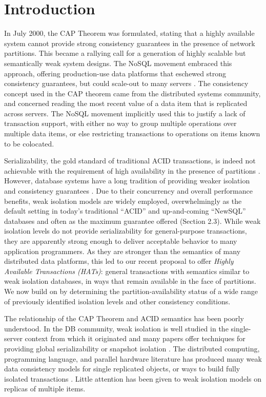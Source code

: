 
\section{Introduction}
In July 2000, the CAP Theorem \cite{40} was formulated, stating that a highly available system cannot provide strong consistency guarantees in the presence of network partitions. This became a rallying call for a generation of highly scalable but semantically weak system designs. The NoSQL movement embraced this approach, offering production-use data platforms that eschewed strong consistency guarantees, but could scale-out to many servers \cite{21, 25, 33}. The consistency concept used in the CAP theorem came from the distributed systems community, and concerned reading the most recent value of a data item that is replicated across servers. The NoSQL movement implicitly used this to justify a lack of  transaction support, with either no way to group multiple operations  over multiple data items, or else restricting transactions to operations on items known to be colocated. 

Serializability, the gold standard of traditional ACID transactions, is indeed not achievable with the requirement of high availability in the presence of partitions \cite{31}. However, database systems have a long tradition of providing weaker isolation and consistency guarantees \cite{4, 13, 43}. Due to their concurrency and overall performance benefits, weak isolation models are widely employed, overwhelmingly as the default setting in today’s traditional “ACID” and up-and-coming “NewSQL” databases and often as the maximum guarantee offered (Section 2.3). While weak isolation levels do not provide serializability for general-purpose transactions, they are apparently strong enough to deliver acceptable behavior to many application programmers. As they are stronger than the semantics of many distributed data platforms, this led to our recent proposal \cite{9} to offer \emph{Highly Available Transactions (HATs)}: general transactions with semantics similar to weak isolation databases, in ways that remain available in the face of partitions. We now build on \cite{9} by determining the partition-availability status of a wide range of previously identified isolation levels and other consistency conditions.

The relationship of the CAP Theorem and ACID semantics has been poorly understood. In the DB community, weak isolation is well studied in the single-server context from which it originated \cite{4, 13, 43} and many papers offer techniques for providing global serializability or snapshot isolation \cite{14,  30, 65; also cite several SI papers from PC members (Kemme, Elnikety, Salem, Daudgee)}. The distributed computing, programming language, and parallel hardware literature has produced many weak data consistency models for single replicated objects, or ways to build fully isolated transactions \cite{26, 28, also 45 (Herlihy-Shavit)}. Little attention has been given to weak isolation models on replicas of multiple items.

